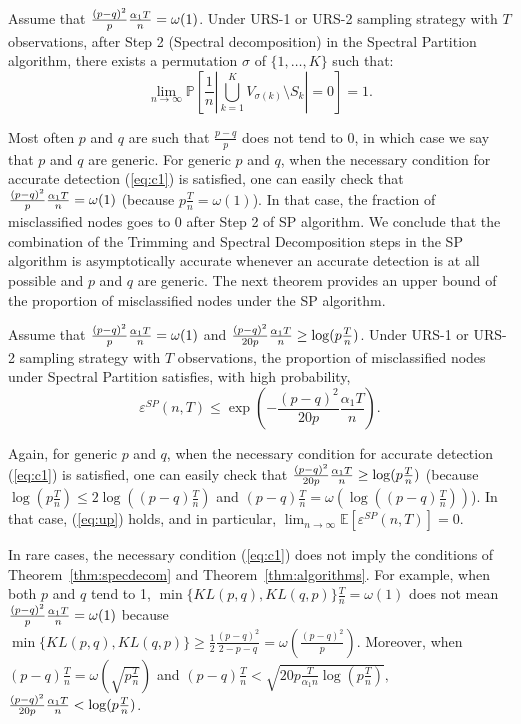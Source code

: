 \begin{theorem} Assume that $\frac{(p-q)^2}{p}{\alpha_1 T\over n} =\omega(1)$. Under URS-1 or URS-2 sampling strategy with $T$ observations, after Step 2 (Spectral decomposition) in the Spectral Partition algorithm, there exists a permutation $\sigma$ of $\{1,\ldots,K\}$ such that:
\begin{equation*}
\lim_{n\to\infty} \mathbb{P}\left[\frac{1}{n}|\bigcup_{k=1}^K V_{\sigma(k)} \setminus S_k| = 0\right]=1.
\end{equation*} \label{thm:specdecom}
\end{theorem}

Most often $p$ and $q$ are such that $\frac{p-q}{p}$ does not tend to 0, in which case we say that $p$ and $q$ are generic. For generic $p$ and $q$, when the necessary condition for accurate detection (\ref{eq:c1}) is satisfied, one can easily check that $\frac{(p-q)^2}{p}{\alpha_1 T\over n} =\omega(1)$ (because $p\frac{T}{n} = \omega(1)$). In that case, the fraction of misclassified nodes goes to 0 after Step 2 of SP algorithm. We conclude that the combination of the Trimming and Spectral Decomposition steps in the SP algorithm is asymptotically accurate whenever an accurate detection is at all possible and $p$ and $q$ are generic. The next theorem provides an upper bound of the proportion of misclassified nodes under the SP algorithm.

\begin{theorem}\label{thm:algorithms} Assume that $\frac{(p-q)^2}{p}{\alpha_1 T\over n} =\omega(1)$ and $\frac{(p-q)^2}{20p}{\alpha_1 T\over n} \ge \log(p{T\over n})$. Under URS-1 or URS-2 sampling strategy with $T$ observations, the proportion of misclassified nodes under Spectral Partition satisfies, with high probability,
\begin{equation}\label{eq:up}
\varepsilon^{SP} (n,T) \le \exp \left(-\frac{(p-q)^2 }{20 p} \frac{\alpha_1  T}{n}\right).
\end{equation}
\end{theorem}

Again, for generic $p$ and $q$, when the necessary condition for accurate detection (\ref{eq:c1}) is satisfied, one can easily check that  $\frac{(p-q)^2}{20p}{\alpha_1 T\over n} \ge \log(p{T\over n})$ (because $\log(p\frac{T}{n}) \le 2\log((p-q)\frac{T}{n})$ and $(p-q)\frac{T}{n}=\omega(\log((p-q)\frac{T}{n}))$). In that case, (\ref{eq:up}) holds, and in particular, $\lim_{n\to\infty}\mathbb{E}[\varepsilon^{SP}(n,T)]=0$.

In rare cases, the necessary condition (\ref{eq:c1}) does not imply the conditions of Theorem~\ref{thm:specdecom} and Theorem~\ref{thm:algorithms}. For example, when both $p$ and $q$ tend to 1, $\min\{KL(p,q),KL(q,p)\}\frac{T}{n} = \omega(1)$ does not mean $\frac{(p-q)^2}{p}{\alpha_1 T\over n} =\omega(1)$  because $\min \{ KL(p,q) , KL(q,p) \} \ge \frac{1}{2}\frac{(p-q)^2}{2-p-q} = \omega(\frac{(p-q)^2}{p})$. Moreover, when $(p-q)\frac{T}{n}=\omega(\sqrt{p\frac{T}{n}})$ and $(p-q)\frac{T}{n} < \sqrt{20p\frac{T}{\alpha_1 n}\log(p\frac{T}{n})},$  $\frac{(p-q)^2}{20p}{\alpha_1 T\over n} < \log(p{T\over n})$.

